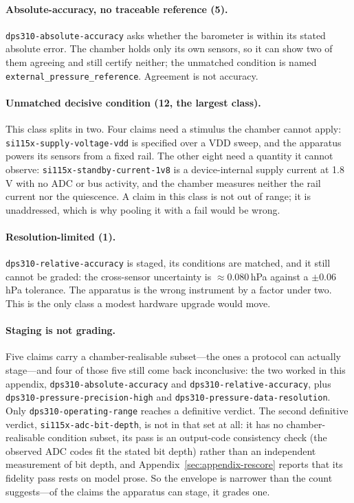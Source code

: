 \documentclass[11pt]{article}
\begin{document}
\paragraph{Absolute-accuracy, no traceable reference (5).}
\texttt{dps310-absolute-accuracy} asks whether the barometer is within
its stated absolute error. The chamber holds only its own sensors, so it
can show two of them agreeing and still certify neither; the unmatched
condition is named \texttt{external\_pressure\_reference}. Agreement is
not accuracy.

\paragraph{Unmatched decisive condition (12, the largest class).}
This class splits in two. Four claims need a stimulus the chamber cannot
apply: \texttt{si115x-supply-voltage-vdd} is specified over a VDD sweep,
and the apparatus powers its sensors from a fixed rail. The other eight
need a quantity it cannot observe: \texttt{si115x-standby-current-1v8}
is a device-internal supply current at 1.8\,V with no ADC or bus
activity, and the chamber measures neither the rail current nor the
quiescence. A claim in this class is not out of range; it is
unaddressed, which is why pooling it with a fail would be wrong.

\paragraph{Resolution-limited (1).}
\texttt{dps310-relative-accuracy} is staged, its conditions are matched,
and it still cannot be graded: the cross-sensor uncertainty is
$\approx$0.080\,hPa against a $\pm$0.06\,hPa tolerance. The apparatus is
the wrong instrument by a factor under two. This is the only class a
modest hardware upgrade would move.

\paragraph{Staging is not grading.}
Five claims carry a chamber-realisable subset---the ones a protocol can
actually stage---and four of those five still come back inconclusive:
the two worked in this appendix, \texttt{dps310-absolute-accuracy} and
\texttt{dps310-relative-accuracy}, plus
\texttt{dps310-pressure-precision-high} and
\texttt{dps310-pressure-data-resolution}. Only
\texttt{dps310-operating-range} reaches a definitive verdict. The second
definitive verdict, \texttt{si115x-adc-bit-depth}, is not in that set at
all: it has no chamber-realisable condition subset, its pass is an
output-code consistency check (the observed ADC codes fit the stated bit
depth) rather than an independent measurement of bit depth, and
Appendix~\ref{sec:appendix-rescore} reports that its fidelity pass rests
on model prose. So the envelope is narrower than the count suggests---of
the claims the apparatus can stage, it grades one.
\end{document}
